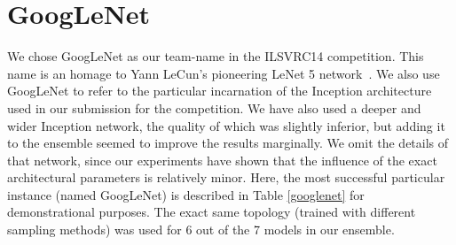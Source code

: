 \section{GoogLeNet}

We chose GoogLeNet as our team-name in the ILSVRC14 competition. This name is an homage to Yann LeCun’s pioneering LeNet 5 network~\cite{lecun1989backprop}. We also use GoogLeNet to refer to the particular incarnation of the Inception architecture used in our submission for the competition. We have also used a deeper and wider Inception network, the quality of which was slightly inferior, but adding it to the ensemble seemed to improve the results marginally. We omit the details of that network, since our experiments have shown that the influence of the exact architectural parameters is relatively minor. Here, the most successful particular instance (named GoogLeNet) is described in Table \ref{googlenet} for demonstrational purposes. The exact same topology (trained with different sampling methods) was used for 6 out of the 7 models in our ensemble.

